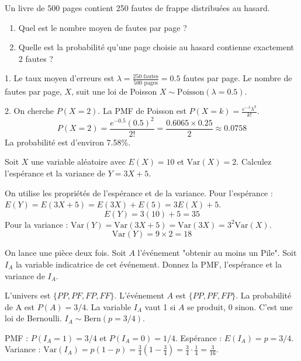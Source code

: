 \begin{exercicebox}
Un livre de 500 pages contient 250 fautes de frappe distribuées au hasard.
\begin{enumerate}
    \item Quel est le nombre moyen de fautes par page ?
    \item Quelle est la probabilité qu'une page choisie au hasard contienne exactement 2 fautes ?
\end{enumerate}
\end{exercicebox}

\begin{correctionbox}
1. Le taux moyen d'erreurs est $\lambda = \frac{250 \text{ fautes}}{500 \text{ pages}} = 0.5$ fautes par page.
Le nombre de fautes par page, $X$, suit une loi de Poisson $X \sim \text{Poisson}(\lambda=0.5)$.

2. On cherche $P(X=2)$. La PMF de Poisson est $P(X=k) = \frac{e^{-\lambda}\lambda^k}{k!}$.
$$ P(X=2) = \frac{e^{-0.5}(0.5)^2}{2!} = \frac{0.6065 \times 0.25}{2} \approx 0.0758 $$
La probabilité est d'environ 7.58\%.
\end{correctionbox}

\begin{exercicebox}
Soit $X$ une variable aléatoire avec $E(X)=10$ et $\text{Var}(X)=2$. Calculez l'espérance et la variance de $Y = 3X + 5$.
\end{exercicebox}

\begin{correctionbox}
On utilise les propriétés de l'espérance et de la variance.
Pour l'espérance :
$E(Y) = E(3X+5) = E(3X) + E(5) = 3E(X) + 5$.
$$ E(Y) = 3(10) + 5 = 35 $$
Pour la variance :
$\text{Var}(Y) = \text{Var}(3X+5) = \text{Var}(3X) = 3^2 \text{Var}(X)$.
$$ \text{Var}(Y) = 9 \times 2 = 18 $$
\end{correctionbox}

\begin{exercicebox}
On lance une pièce deux fois. Soit $A$ l'événement "obtenir au moins un Pile". Soit $I_A$ la variable indicatrice de cet événement. Donnez la PMF, l'espérance et la variance de $I_A$.
\end{exercicebox}

\begin{correctionbox}
L'univers est $\{PP, PF, FP, FF\}$. L'événement $A$ est $\{PP, PF, FP\}$.
La probabilité de A est $P(A) = 3/4$.
La variable $I_A$ vaut 1 si $A$ se produit, 0 sinon. C'est une loi de Bernoulli.
$I_A \sim \text{Bern}(p=3/4)$.

PMF : $P(I_A=1) = 3/4$ et $P(I_A=0) = 1/4$.
Espérance : $E(I_A) = p = 3/4$.
Variance : $\text{Var}(I_A) = p(1-p) = \frac{3}{4} \left(1-\frac{3}{4}\right) = \frac{3}{4} \cdot \frac{1}{4} = \frac{3}{16}$.
\end{correctionbox}

